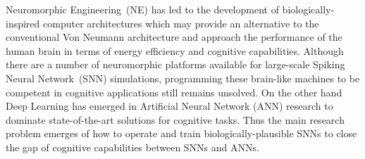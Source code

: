 







Neuromorphic Engineering~(NE) has led to the development of biologically-inspired computer architectures which may provide an alternative to the conventional Von Neumann architecture and approach the performance of the human brain in terms of energy efficiency and cognitive capabilities.
Although there are a number of neuromorphic platforms available for large-scale Spiking Neural Network~(SNN) simulations, programming these brain-like machines to be competent in cognitive applications still remains unsolved.
On the other hand Deep Learning has emerged in Artificial Neural Network (ANN) research to dominate state-of-the-art solutions for cognitive tasks.
Thus the main research problem emerges of how to operate and train biologically-plausible SNNs to close the gap of cognitive capabilities between SNNs and ANNs.

